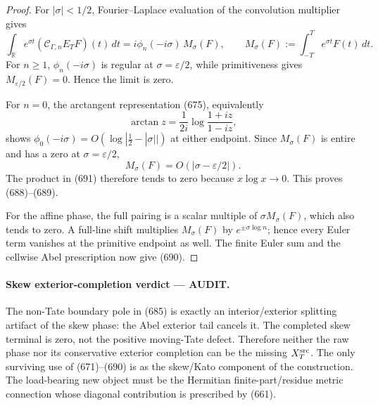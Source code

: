 \documentclass[11pt]{article}
\newcommand{\AUDIT}{\textcolor{orange!75!black}{\textbf{AUDIT}}}
\begin{document}
\begin{proof}
For \(|\sigma|<1/2\), Fourier--Laplace evaluation of the convolution
multiplier gives
\begin{equation}
 \int_{\mathbb R}e^{\sigma t}
   (\mathscr C_{\Gamma,n}E_TF)(t)\,dt
 =i\phi_n(-i\sigma)\,
   M_\sigma(F),\qquad
 M_\sigma(F):=\int_{-T}^{T}e^{\sigma t}F(t)\,dt.     \tag{691}
\end{equation}
For \(n\ge1\), \(\phi_n(-i\sigma)\) is regular at
\(\sigma=\varepsilon/2\), while primitiveness gives
\(M_{\varepsilon/2}(F)=0\).  Hence the limit is zero.

For \(n=0\), the arctangent representation (675), equivalently
\[
 \arctan z=\frac1{2i}\log\frac{1+iz}{1-iz},
\]
shows
\(\phi_0(-i\sigma)=O(\log|\frac12-|\sigma||)\) at either endpoint.
Since \(M_\sigma(F)\) is entire and has a zero at
\(\sigma=\varepsilon/2\),
\[
 M_\sigma(F)=O(|\sigma-\varepsilon/2|).
\]
The product in (691) therefore tends to zero because
\(x\log x\to0\).  This proves (688)--(689).

For the affine phase, the full pairing is a scalar multiple of
\(\sigma M_\sigma(F)\), which also tends to zero.  A full-line shift
multiplies \(M_\sigma(F)\) by \(e^{\pm\sigma\log n}\); hence every Euler
term vanishes at the primitive endpoint as well.  The finite Euler sum and
the cellwise Abel prescription now give (690).
\end{proof}

\paragraph{Skew exterior-completion verdict --- \AUDIT.}
The non-Tate boundary pole in (685) is exactly an interior/exterior splitting
artifact of the skew phase: the Abel exterior tail cancels it.  The
completed skew terminal is zero, not the positive moving-Tate defect.
Therefore neither the raw phase nor its conservative exterior completion
can be the missing \(X_T^{\rm src}\).  The only surviving use of
(671)--(690) is as the skew/Kato component of the construction.  The
load-bearing new object must be the Hermitian finite-part/residue metric
connection whose diagonal contribution is prescribed by (661).
\end{document}
